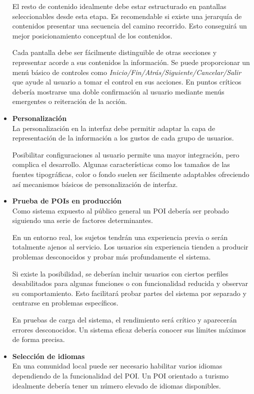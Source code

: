 \begin{itemize}
{El resto de contenido idealmente debe estar estructurado en pantallas
seleccionables desde esta etapa. Es recomendable si existe una jerarquía de
contenidos presentar una secuencia del camino recorrido. Esto conseguirá un
mejor posicionamiento conceptual de los contenidos.

Cada pantalla debe ser fácilmente distinguible de otras secciones y representar
acorde a sus contenidos la información. Se puede proporcionar un menú básico de
controles como \emph{Inicio/Fin/Atrás/Siguiente/Cancelar/Salir} que ayude al
usuario a tomar el control en sus acciones. En puntos críticos debería mostrarse una
doble confirmación al usuario mediante menús emergentes o reiteración de 
la acción.
  } 
  \item{\textbf{Personalización}\\
  La personalización en la interfaz debe permitir adaptar la capa de
  representación de la información a los gustos de cada grupo de usuarios.

Posibilitar configuraciones al usuario permite una mayor
integración\cite{Fis00}, pero complica el desarrollo. Algunas características
como los tamaños de las fuentes tipográficas, color o fondo suelen ser
fácilmente adaptables ofreciendo así mecanismos básicos de personalización de
interfaz.}
  \item{\textbf{Prueba de POIs en producción}\\
  \label{sec:poiproduccion}
Como sistema expuesto al público general un POI debería ser probado siguiendo
una serie de factores determinantes.

En un entorno real, los sujetos tendrán una experiencia previa o serán
totalmente ajenos al servicio. Los usuarios sin experiencia tienden a producir
problemas desconocidos y probar más profundamente el sistema.

Si existe la posibilidad, se deberían incluir usuarios con ciertos
perfiles desabilitados para algunas funciones o con funcionalidad reducida y
observar su comportamiento.
Esto facilitará probar partes del sistema por separado y centrarse en problemas
específicos.

En pruebas de carga del sistema, el rendimiento será crítico y aparecerán
errores desconocidos. Un sistema eficaz debería conocer sus límites máximos de
forma precisa\cite{Mag07}.
  } 
  \item{\textbf{Selección de idiomas}\\
  \label{sec:selectlanguage}
En una comunidad local puede ser necesario habilitar varios idiomas dependiendo
de la funcionalidad del POI. Un POI orientado a turismo idealmente debería
tener un número elevado de idiomas disponibles. 

}
\end{itemize}

